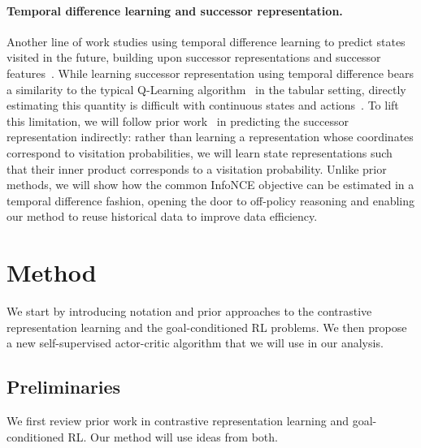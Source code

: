 \documentclass{article} %
\begin{document}
\paragraph{Temporal difference learning and successor representation.} Another line of work studies using temporal difference learning to predict states visited in the future, building upon successor representations and successor features~\citep{dayan1993improving, barreto2017successor, barreto2019option, blier2021learning}. While learning successor representation using temporal difference bears a similarity to the typical Q-Learning algorithm~\citep{watkins1992q, fu2019diagnosing, mnih2015human} in the tabular setting,  directly estimating this quantity is difficult with continuous states and actions~\citep{janner2020gamma, barreto2017successor, touati2021learning, blier2021learning}. To lift this limitation, we will follow prior work~\citep{eysenbach2022contrastive, eysenbach2020c, touati2021learning} in predicting the successor representation indirectly: rather than learning a representation whose coordinates correspond to visitation probabilities, we will learn state representations such that their inner product corresponds to a visitation probability. Unlike prior methods, we will show how the common InfoNCE objective can be estimated in a temporal difference fashion, opening the door to off-policy reasoning and enabling our method to reuse historical data to improve data efficiency.

\section{Method}
\label{sec:method}

We start by introducing notation and prior approaches to the contrastive representation learning and the goal-conditioned RL problems. We then propose a new self-supervised actor-critic algorithm that we will use in our analysis.

\subsection{Preliminaries}
We first review prior work in contrastive representation learning and goal-conditioned RL. Our method will use ideas from both.
\end{document}
